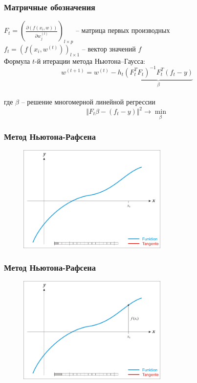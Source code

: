 \documentclass[10pt]{beamer}
\begin{document}
\begin{frame}\frametitle{Матричные обозначения}
	$F_t = \left(\frac{\partial(f(x_i, w))}{\partial w_j^{(t)}}\right)_{l \times p}$ -- матрица первых производных\\
	$f_t = \left( f(x_i, w^{(t)}) \right)_{l \times 1}$ -- вектор значений $f$\\
	\bigbreak
	Формула $t$-й итерации метода Ньютона–Гаусса:\\
	$$w^{(t+1)} = w^{(t)} - h_t \underbrace{\left( F^T_tF_t \right)^{-1} F_t^T(f_t -y)}_{\beta}$$\\
	где $\beta$ -- решение многомерной линейной регрессии\\
	$$\Vert F_t\beta - (f_t-y) \Vert^2 \rightarrow \min_{\beta}$$ 
\end{frame}

\begin{frame}\frametitle{Метод Ньютона-Рафсена}
	\begin{figure}[htbp]
	  \includegraphics[height=150pt, keepaspectratio = true]{images/newton-1}   
	\end{figure}
\end{frame}

\begin{frame}\frametitle{Метод Ньютона-Рафсена}
	\begin{figure}[htbp]
	  \includegraphics[height=150pt, keepaspectratio = true]{images/newton-2}   
	\end{figure}
\end{frame}
\end{document}
